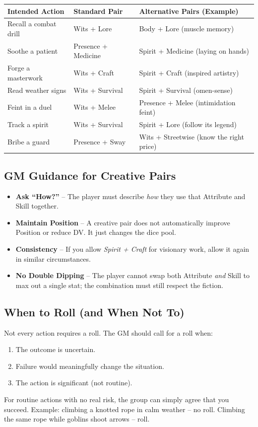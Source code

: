 \begin{center}
\small
\begin{tabular}{lll}
\toprule
\textbf{Intended Action} & \textbf{Standard Pair} & \textbf{Alternative Pairs (Example)} \\
\midrule
Recall a combat drill & Wits + Lore & Body + Lore (muscle memory) \\
Soothe a patient & Presence + Medicine & Spirit + Medicine (laying on hands) \\
Forge a masterwork & Wits + Craft & Spirit + Craft (inspired artistry) \\
Read weather signs & Wits + Survival & Spirit + Survival (omen-sense) \\
Feint in a duel & Wits + Melee & Presence + Melee (intimidation feint) \\
Track a spirit & Wits + Survival & Spirit + Lore (follow its legend) \\
Bribe a guard & Presence + Sway & Wits + Streetwise (know the right price) \\
\bottomrule
\end{tabular}
\end{center}

\subsection{GM Guidance for Creative Pairs}
\label{sec:gm-creative-pairs}
\begin{itemize}
  \item \textbf{Ask ``How?''} -- The player must describe \textit{how} they use
        that Attribute and Skill together.
  \item \textbf{Maintain Position} -- A creative pair does not automatically
        improve Position or reduce DV. It just changes the dice pool.
  \item \textbf{Consistency} -- If you allow \textit{Spirit + Craft} for
        visionary work, allow it again in similar circumstances.
  \item \textbf{No Double Dipping} -- The player cannot swap both Attribute
        \textit{and} Skill to max out a single stat; the combination must
        still respect the fiction.
\end{itemize}

\subsection{When to Roll (and When Not To)}
\label{sec:when-to-roll}
Not every action requires a roll. The GM should call for a roll when:
\begin{enumerate}
  \item The outcome is uncertain.
  \item Failure would meaningfully change the situation.
  \item The action is significant (not routine).
\end{enumerate}
For routine actions with no real risk, the group can simply agree that you
succeed. Example: climbing a knotted rope in calm weather -- no roll.
Climbing the same rope while goblins shoot arrows -- roll.

